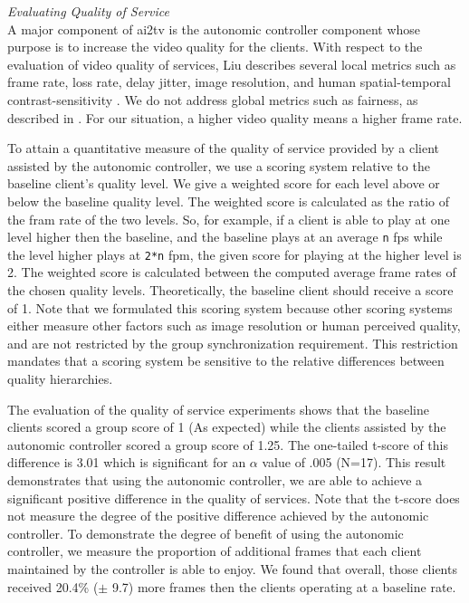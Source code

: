\documentclass{sig-alternate}
\begin{document}
\textit{Evaluating Quality of Service} \\
A major component of ai2tv is the autonomic controller component whose
purpose is to increase the video quality for the clients.  With
respect to the evaluation of video quality of services, Liu describes
several local metrics such as frame rate, loss rate, delay jitter, image
resolution, and human spatial-temporal contrast-sensitivity
\cite{LIU}.  We do not address global metrics such as fairness, as
described in \cite{LIU}.  For our situation, a higher video quality
means a higher frame rate.

To attain a quantitative measure of the quality of service provided by
a client assisted by the autonomic controller, we use a scoring system
relative to the baseline client's quality level.  We give a weighted
score for each level above or below the baseline quality level.  The
weighted score is calculated as the ratio of the fram rate of the two levels.  
So, for example, if a client is able
to play at one level higher then the baseline, and the baseline plays
at an average \texttt{n} fps while the level higher plays at \texttt{2*n} fpm, the given
score for playing at the higher level is 2.  The weighted score is
calculated between the computed average frame rates of the chosen
quality levels.  Theoretically, the baseline client should receive a
score of 1.  Note that we
formulated this scoring system because other scoring systems
\cite{scoring systems} either measure other factors such as image
resolution or human perceived quality, and are not restricted by the
group synchronization requirement.  This restriction mandates that a
scoring system be sensitive to the relative differences between
quality hierarchies.

The evaluation of the quality of service experiments shows that the baseline
clients scored a group score of 1 (As expected) while the clients assisted by the
autonomic controller scored a group score of 1.25.  The one-tailed
t-score of this difference is 3.01 which is significant for an
$\alpha$ value of .005 (N=17).  This result demonstrates that using
the autonomic controller, we are able to achieve a significant
positive difference in the quality of services.  Note that the t-score
does not measure the degree of the positive difference achieved by the
autonomic controller.  To demonstrate the degree of benefit of using
the autonomic controller, we measure the proportion of additional
frames that each client maintained by the controller is able to enjoy.
We found that overall, those clients received 20.4\% ($\pm$ 9.7) more
frames then the clients operating at a baseline rate.
\end{document}
